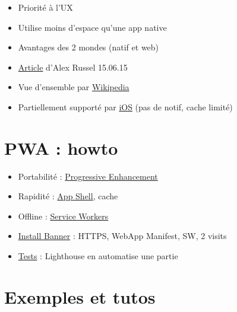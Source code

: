 \begin{itemize}
\tightlist
\item
  Priorité à l'UX
\item
  Utilise moins d'espace qu'une app native
\item
  Avantages des 2 mondes (natif et web)
\item
  \href{https://infrequently.org/2015/06/progressive-apps-escaping-tabs-without-losing-our-soul/}{Article}
  d'Alex Russel 15.06.15
\item
  Vue d'ensemble par
  \href{https://en.wikipedia.org/wiki/Progressive_web_app}{Wikipedia}
\item
  Partiellement supporté par \href{https://love2dev.com/pwa/ios/}{iOS}
  (pas de notif, cache limité)
\end{itemize}

\hypertarget{pwa-howto}{%
\section{PWA : howto}\label{pwa-howto}}

\begin{itemize}
\tightlist
\item
  Portabilité :
  \href{https://www.smashingmagazine.com/2009/04/progressive-enhancement-what-it-is-and-how-to-use-it/}{Progressive
  Enhancement}
\item
  Rapidité :
  \href{https://developers.google.com/web/updates/2015/11/app-shell}{App
  Shell}, cache
\item
  Offline :
  \href{https://jakearchibald.com/2014/service-worker-first-draft/}{Service
  Workers}
\item
  \href{https://developers.google.com/web/fundamentals/app-install-banners/}{Install
  Banner} : HTTPS, WebApp Manifest, SW, 2 visits
\item
  \href{https://developers.google.com/web/progressive-web-apps/checklist}{Tests}
  : Lighthouse en automatise une partie
\end{itemize}

\hypertarget{exemples-et-tutos}{%
\section{Exemples et tutos}\label{exemples-et-tutos}}

